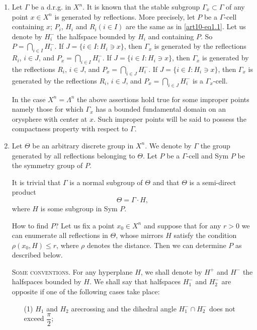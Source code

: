 \begin{enumerate}
\item Let $\Gamma$ be a d.r.g. in $X^n$. It is known that the stable subgroup $\Gamma_x \subset \Gamma$ of any point $x \in X^n$ is generated by reflections. More precisely, let $P$ be a $\Gamma$-cell containing $x$; $P_i$, $H_i$ and $R_i (i \in I)$  are the same as in \eqref{art10-eq1.1}. Let us denote by $H^-_i$ the halfspace bounded  by $H_i$ and containing $P$. So $P= \bigcap\limits_{i \in I} H^-_i$. If $J = \{i \in I : H_i \ni x\}$, then $\Gamma_x$ is generated by the reflections $R_i$, $i \in J$, and $P_x = \bigcap\limits_{i \in I} H^-_i$. If $J = \{i \in I: H_i \ni x\}$, then $\Gamma_x$ is generated by the reflections $R_i$, $i \in J$, and $P_x = \bigcap\limits_{i \in J} H^-_i$. If $J = \{i \in I: H_i \ni x\}$, then $\Gamma_x$ is generated by the reflections $R_i$, $i \in J$, and $P_x = \bigcap\limits_{i \in J}H^-_i$  is a $\Gamma_x$-cell.

In the case $X^n = \Lambda^n$ the above assertions hold true for some improper points namely those for which $\Gamma_x$ has a bounded fundamental domain on an orysphere with  center at $x$. Such improper points will be said to possess the compactness property with respect to $\Gamma$. 

\item Let $\Theta$ be an arbitrary discrete group in $X^n$. We denote by $\Gamma$ the group generated by all reflections belonging to $\Theta$. Let $P$ be a $\Gamma$-cell and Sym $P$ be the symmetry group of $P$.

It is trivial that $\Gamma$ is a normal subgroup of $\Theta$ and that $\Theta$ is a semi-direct product 
\begin{equation}
\Theta = \Gamma \cdot H, \label{art10-eq1.1} 
\end{equation}
where $H$ is some subgroup in Sym $P$.

How to find $P$? Let us fix a point $x_0 \in X^n$ and suppose that for any $r >0$ we can enumerate all reflections in $\Theta$, whose mirrors $H$ satisfy the condition $\rho (x_0, H) \leqslant r$, where $\rho$ denotes the distance. Then we can determine $P$ as described below.

\medskip
\textsc{Some conventions.} For any hyperplane $H$, we shall denote by $H^+$ and $H^-$ the halfspaces bounded by $H$. We shall say that halfspaces $H^-_1$ and $H^-_2$ are opposite if one of the following cases take place:
\begin{itemize}
\item[(1)] $H_1$ and $H_2$ are\pageoriginale crossing and the dihedral angle $H^-_1 \cap H^-_2$ does not exceed $\dfrac{\pi}{2}$;


\end{itemize}
\end{enumerate}
